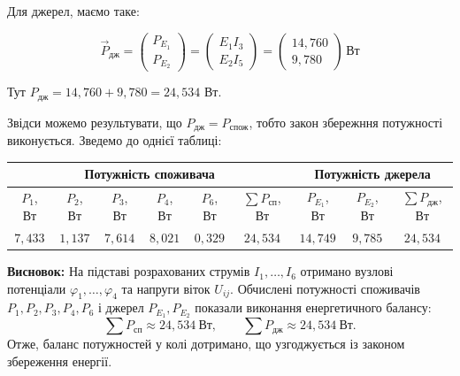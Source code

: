 \documentclass[12pt,a4paper]{article}
\begin{document}
    Для джерел, маємо таке:

    \[
    \displaystyle
    \vec{P}_{\text{дж}} = 
    \begin{pmatrix}
    P_{E_1}\\
    P_{E_2}
    \end{pmatrix}
    =
    \begin{pmatrix}
    E_{1} I_{3}\\
    E_{2} I_{5}
    \end{pmatrix}
    =
    \begin{pmatrix}
    14{,}760\\
    9{,}780
    \end{pmatrix}\,\text{Вт}
    \]

    \vspace{1em}

    Тут $P_{\text{дж}} = 14{,}760 + 9{,}780 = 24{,}534$ Вт.

    Звідси можемо результувати, що $P_{\text{дж}} = P_{\text{спож}}$, тобто закон збережння потужності виконується.
    Зведемо до однієї таблиці:

    \begin{table}[h]
    \centering
    \renewcommand{\arraystretch}{1.2}
    \begin{tabular}{|*{9}{c|}}
    \hline
    \multicolumn{6}{|c|}{\textbf{Потужність споживача}} &
    \multicolumn{3}{c|}{\textbf{Потужність джерела}}\\
    \hline
    $P_{1}$, Вт & $P_{2}$, Вт & $P_{3}$, Вт & $P_{4}$, Вт & $P_{6}$, Вт & $\sum P_{\text{сп}}$, Вт
    & $P_{E_1}$, Вт & $P_{E_2}$, Вт & $\sum P_{\text{дж}}$, Вт\\
    \hline
    $7{,}433$ & $1{,}137$ & $7{,}614$ & $8{,}021$ & $0{,}329$ & $24{,}534$ & $14{,}749$ & $9{,}785$ & $24{,}534$\\
    \hline
    \end{tabular}
    \end{table}

    \setlength{\parindent}{0em}

    \textbf{Висновок:} 
    На підставі розрахованих струмів $I_1,\dots,I_6$ отримано вузлові потенціали $\varphi_1,\dots,\varphi_4$
    та напруги віток $U_{ij}$. Обчислені потужності споживачів
    $P_1,P_2,P_3,P_4,P_6$ і джерел $P_{E_1},P_{E_2}$ показали виконання енергетичного балансу:
    \[
    \sum P_{\text{сп}} \approx 24{,}534~\text{Вт},\qquad
    \sum P_{\text{дж}} \approx 24{,}534~\text{Вт}.
    \]
    Отже, баланс потужностей у колі дотримано, що узгоджується із законом збереження енергії.
\end{document}
